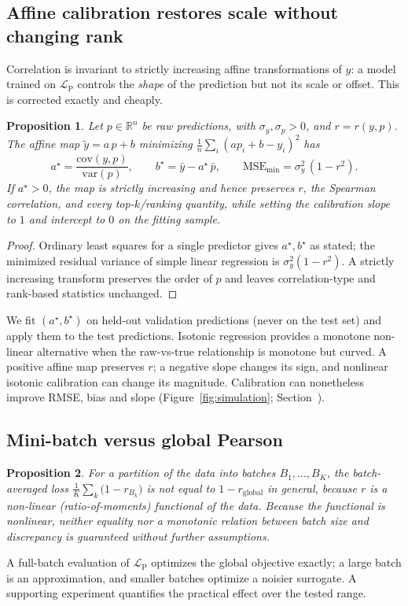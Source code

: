 \documentclass[9pt,twocolumn,twoside,lineno]{gsag3jnl}
\theoremstyle{plain}
\newtheorem{proposition}{Proposition}
\theoremstyle{remark}
\begin{document}
\subsection{Affine calibration restores scale without changing rank}\label{sec:prop2}
Correlation is invariant to strictly increasing affine transformations of $\hat
y$: a model trained on $\mathcal{L}_{\mathrm{P}}$ controls the \emph{shape} of the
prediction but not its scale or offset. This is corrected exactly and cheaply.
\begin{proposition}\label{prop:2}
Let $p\in\mathbb{R}^n$ be raw predictions, with $\sigma_y,\sigma_p>0$,
and $r=r(y,p)$. The affine map
$\tilde y = a\,p+b$ minimizing $\tfrac1n\sum_i (a p_i + b - y_i)^2$ has
\[
a^\star = \frac{\mathrm{cov}(y,p)}{\mathrm{var}(p)},\qquad
b^\star = \bar y - a^\star\,\bar p,\qquad
\mathrm{MSE}_{\min} = \sigma_y^2\,(1-r^2).
\]
If $a^\star>0$, the map is strictly increasing and hence preserves $r$, the
Spearman correlation, and every top-$k$/ranking quantity, while setting the
calibration slope to $1$ and intercept to $0$ on the fitting sample.
\end{proposition}
\begin{proof}
Ordinary least squares for a single predictor gives $a^\star,b^\star$ as stated;
the minimized residual variance of simple linear regression is
$\sigma_y^2(1-r^2)$. A strictly increasing transform preserves the order of $p$
and leaves correlation-type and rank-based statistics unchanged.
\end{proof}
We fit $(a^\star,b^\star)$ on held-out validation predictions (never on the test
set) and apply them to the test predictions. Isotonic regression provides a
monotone non-linear alternative when the raw-vs-true relationship is monotone but
curved. A positive affine map preserves $r$; a negative slope changes its sign,
and nonlinear isotonic calibration can change its magnitude. Calibration can
nonetheless improve RMSE, bias and slope (Figure~\ref{fig:simulation};
Section~).

\subsection{Mini-batch versus global Pearson}\label{sec:prop3}
\begin{proposition}\label{prop:3}
For a partition of the data into batches $B_1,\dots,B_K$, the batch-averaged loss
$\tfrac1K\sum_k \bigl(1-r_{B_k}\bigr)$ is not equal to $1-r_{\mathrm{global}}$ in
general, because $r$ is a non-linear (ratio-of-moments) functional of the data.
Because the functional is nonlinear, neither equality nor a monotonic relation
between batch size and discrepancy is guaranteed without further assumptions.
\end{proposition}
A full-batch evaluation of $\mathcal{L}_{\mathrm{P}}$ optimizes the global
objective exactly; a large batch is an approximation, and smaller batches
optimize a noisier surrogate. A supporting experiment quantifies the practical
effect over the tested range.
\end{document}
